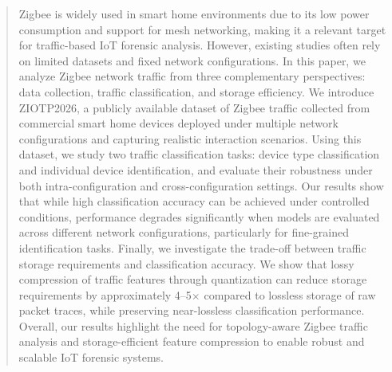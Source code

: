 \documentclass[preprint,12pt]{elsarticle}
\begin{document}
\begin{frontmatter}

\begin{abstract}
Zigbee is widely used in smart home environments due to its low power consumption and support for mesh networking, making it a relevant target for traffic-based IoT forensic analysis. However, existing studies often rely on limited datasets and fixed network configurations.
In this paper, we analyze Zigbee network traffic from three complementary perspectives: data collection, traffic classification, and storage efficiency. We introduce ZIOTP2026, a publicly available dataset of Zigbee traffic collected from commercial smart home devices deployed under multiple network configurations and capturing realistic interaction scenarios.
Using this dataset, we study two traffic classification tasks: device type classification and individual device identification, and evaluate their robustness under both intra-configuration and cross-configuration settings. Our results show that while high classification accuracy can be achieved under controlled conditions, performance degrades significantly when models are evaluated across different network configurations, particularly for fine-grained identification tasks.
Finally, we investigate the trade-off between traffic storage requirements and classification accuracy. We show that lossy compression of traffic features through quantization can reduce storage requirements by approximately 4--5$\times$ compared to lossless storage of raw packet traces, while preserving near-lossless classification performance.
Overall, our results highlight the need for topology-aware Zigbee traffic analysis and storage-efficient feature compression to enable robust and scalable IoT forensic systems.%
\end{abstract}


\end{frontmatter}
\end{document}
